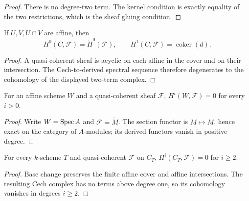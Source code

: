 \begin{proof}
  There is no degree-two term.  The kernel condition is exactly equality of
  the two restrictions, which is the sheaf gluing condition.
\end{proof}

\begin{proposition}
  \label{mk-prop-cech-computes}
  \cite{stacks-cohomology-schemes}
  If \(U,V,U\cap V\) are affine, then
  \[
    H^0(C,\mathcal F)=\check H^0(\mathcal F),\qquad
    H^1(C,\mathcal F)=\operatorname{coker}(d).
  \]
\end{proposition}

\begin{proof}
  A quasi-coherent sheaf is acyclic on each affine in the cover and on their
  intersection.  The Cech-to-derived spectral sequence therefore degenerates
  to the cohomology of the displayed two-term complex.
\end{proof}

\begin{lemma}
  \label{mk-lem-affine-h1-vanishing}
  \cite{stacks-cohomology-schemes}
  For an affine scheme \(W\) and a quasi-coherent sheaf \(\mathcal F\),
  \(H^i(W,\mathcal F)=0\) for every \(i>0\).
\end{lemma}

\begin{proof}
  Write \(W=\operatorname{Spec} A\) and \(\mathcal F=\widetilde M\).  The section functor is
  \(M\mapsto M\), hence exact on the category of \(A\)-modules; its derived
  functors vanish in positive degree.
\end{proof}

\begin{lemma}
  \label{mk-lem-curve-h2-vanishing}
  \cite{stacks-cohomology-schemes}
  For every \(k\)-scheme \(T\) and quasi-coherent \(\mathcal F\) on \(C_T\),
  \(H^i(C_T,\mathcal F)=0\) for \(i\ge2\).
\end{lemma}

\begin{proof}
  Base change preserves the finite affine cover and affine intersections.
  The resulting Cech complex has no terms above degree one, so its cohomology
  vanishes in degrees \(i\ge2\).
\end{proof}

